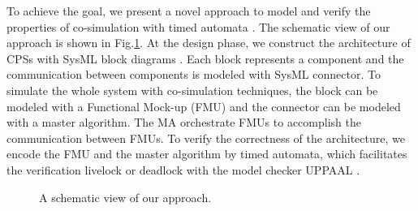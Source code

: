 To achieve the goal, we present a novel approach to model and verify the properties of co-simulation with timed automata \cite{AlurD94}. The schematic view of our approach is shown in Fig.\ref{paperarc}.
At the design phase, we construct the architecture of CPSs with SysML block diagrams \cite{RahimHI17}. Each block represents a component and the communication between components is modeled with SysML connector. To simulate the whole system with co-simulation techniques, the block can be modeled with a Functional Mock-up  (FMU) and the connector can be modeled with a master algorithm. The MA orchestrate FMUs to accomplish the communication between FMUs. To verify the correctness of the architecture, we encode the FMU and the master algorithm by timed automata, which facilitates the verification livelock or deadlock with the model checker UPPAAL \cite{BehrmannDLHPYH06}.
\begin{figure}[htbp]
	\begin{center}
	\caption{A schematic view of our approach.}
	\end{center}\label{paperarc}
\end{figure}
\\

